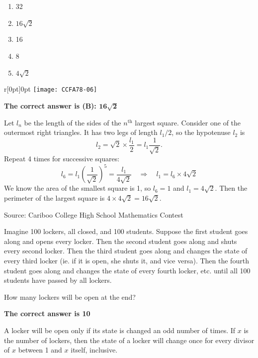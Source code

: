 \documentclass{article}
\begin{document}
\begin{enumerate}[noitemsep,topsep=0mm,leftmargin=*,widest=D,label=\Alph*)]
	\item 32
	\item $16\sqrt{2}$
	\item 16
	\item 8
	\item $4\sqrt{2}$
\end{enumerate}

\begin{wrapfigure}{r}[0pt]{0pt}
	\texttt{[image: CCFA78-06]}
\end{wrapfigure}
\textbf{The correct answer is (B): $\mathbf{16\sqrt{2}}$}

Let $l_n$ be the length of the sides of the $n^\text{th}$ largest square. Consider one of the outermost right triangles. It has two legs of length $l_1/2$, so the hypotenuse $l_2$ is
\[
l_2 = \sqrt{2} \times \frac{l_1}{2} = l_1 \frac{1}{\sqrt{2}}.
\]
Repeat 4 times for successive squares:
\[
l_6 =  l_1 \left(\frac{1}{\sqrt{2}}\right)^5 = \frac{l_1}{4\sqrt{2}} \quad \Longrightarrow \quad l_1 = l_6 \times 4 \sqrt{2} 
\]
We know the area of the smallest square is 1, so $l_6=1$ and $l_1 = 4\sqrt{2}$. Then the perimeter of the largest square is $4\times 4\sqrt{2} = 16 \sqrt{2}$.

\vskip 1.5cm


\scriptsize
Source: Cariboo College High School Mathematics Contest

\normalsize
Imagine 100 lockers, all closed, and 100 students. Suppose the first student goes along and opens every locker. Then the second student goes along and shuts every second locker. Then the third student goes along and changes the state of every third locker (ie. if it is open, she shuts it, and vice versa). Then the fourth student goes along and changes the state of every fourth locker, etc. until all 100 students have passed by all lockers.

How many lockers will be open at the end?

\textbf{The correct answer is 10}

A locker will be open only if its state is changed an odd number of times. If $x$ is the number of lockers, then the state of a locker will change once for every divisor of $x$ between 1 and $x$ itself, inclusive.
\end{document}
